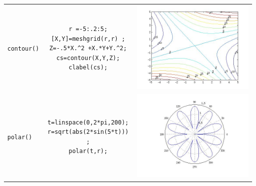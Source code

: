 \documentclass[11pt]{article}
\begin{document}
\begin{center}
\begin{longtable}{||l|c|c||}
\begin{minipage}{0.3\textwidth}
\end{minipage}
\\
\hline
  \texttt{contour()}		& 
\begin{minipage}{3in}
\begin{verbatim}
r =-5:.2:5;
[X,Y]=meshgrid(r,r) ;
Z=-.5*X.^2 +X.*Y+Y.^2;
cs=contour(X,Y,Z);
clabel(cs);
\end{verbatim}
\end{minipage} 
&
\begin{minipage}{0.3\textwidth}
\includegraphics[width=\textwidth]{./ej3.jpg}
\end{minipage}
\\
\hline
  \texttt{polar()}		& 
\begin{minipage}{3in}
\begin{verbatim}
t=linspace(0,2*pi,200);
r=sqrt(abs(2*sin(5*t))) ;
polar(t,r);
\end{verbatim}
\end{minipage} 
&
\begin{minipage}{0.3\textwidth}
\includegraphics[width=\textwidth]{./ej4.jpg}

\end{minipage}
\end{longtable}
\end{center}
\end{document}
